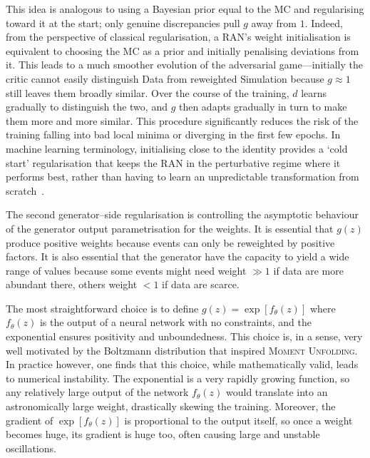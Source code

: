 {{            This idea is analogous to using a Bayesian prior equal to the MC and regularising toward it at the start; only genuine discrepancies pull $g$ away from \(1\).
            Indeed, from the perspective of classical regularisation, a RAN's weight initialisation is equivalent to choosing the MC as a prior and initially penalising deviations from it.
            This leads to a much smoother evolution of the adversarial game---initially the critic cannot easily distinguish Data from reweighted Simulation because $g\approx 1$ still leaves them broadly similar.
            Over the course of the training, $d$ learns gradually to distinguish the two, and $g$ then adapts gradually in turn to make them more and more similar.
            This procedure significantly reduces the risk of the training falling into bad local minima or diverging in the first few epochs.
            In machine learning terminology, initialising close to the identity provides a `cold start' regularisation that keeps the RAN in the perturbative regime where it performs best, rather than having to learn an unpredictable transformation from scratch~\cite{houlsby_parameter-efficient_2019, pan_idinit_2025, zhao_zero_2022, Caselle2022StochasticTheory, jiang_algorithmic_2022}.

            The second generator--side regularisation is controlling the asymptotic behaviour of the generator output parametrisation for the weights.
            It is essential that $g(z)$ produce positive weights because events can only be reweighted by positive factors.
            It is also essential that the generator have the capacity to yield a wide range of values  because some events might need weight $\gg 1$ if data are more abundant there, others weight $<1$ if data are scarce. 
            
            The most straightforward choice is to define $g(z) = \exp[f_\theta(z)]$ where $f_\theta(z)$ is the output of a neural network with no constraints, and the exponential ensures positivity and unboundedness.
            This choice is, in a sense, very well motivated by the Boltzmann distribution that inspired \textsc{Moment Unfolding}.
            In practice however, one finds that this choice, while mathematically valid, leads to numerical instability.
            The exponential is a very rapidly growing function, so any relatively large output of the network $f_\theta(z)$ would translate into an astronomically large weight, drastically skewing the training.
            Moreover, the gradient of $\exp[f_\theta(z)]$ is proportional to the output itself, so once a weight becomes huge, its gradient is huge too, often causing large and unstable oscillations.
            
}}
